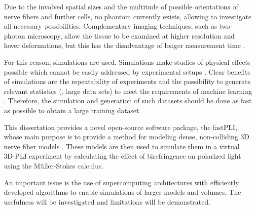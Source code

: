 Due to the involved spatial sizes and the multitude of possible orientations of nerve fibers and further cells, no phantom currently exists, allowing to investigate all necessary possibilities.
Complementary imaging techniques, such as two-photon microscopy, allow the tissue to be examined at higher resolution and lower deformations, but this has the disadvantage of longer measurement time \cite{Costantini2020, Costantini2021}.
\par
%
For this reason, simulations are used.
Simulations make studies of physical effects possible which cannot be easily addressed by experimental setups \cite{Callaghan2019, Menzel2020}.
Clear benefits of simulations are the repeatability of experiments and the possibility to generate relevant statistics (\ie{}, large data sets) to meet \eg{} the requirements of machine learning \cite{Ginsburger2018, ginsburgerDis2019}.
Therefore, the simulation and generation of such datasets should be done as fast as possible to obtain a large training dataset.
\par
%
This dissertation provides a novel open-source software package, the \ac{fastPLI}, whose main purpose is to provide a method for modeling dense, non-colliding 3D nerve fiber models \cite{Matuschke2019, Matuschke2021, Reuter2019}.
These models are then used to simulate them in a virtual \ac{3D-PLI} experiment by calculating the effect of birefringence on polarized light using the M{\"u}ller-Stokes calculus.
\par
%
An important issue is the use of supercomputing architectures with efficiently developed algorithms to enable simulations of larger models and volumes.
The usefulness will be investigated and limitations will be demonstrated.